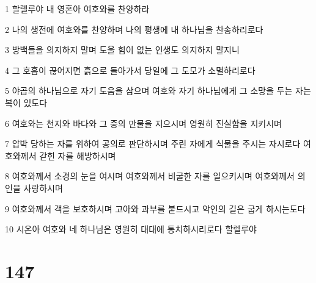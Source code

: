 \par 1 할렐루야 내 영혼아 여호와를 찬양하라
\par 2 나의 생전에 여호와를 찬양하며 나의 평생에 내 하나님을 찬송하리로다
\par 3 방백들을 의지하지 말며 도울 힘이 없는 인생도 의지하지 말지니
\par 4 그 호흡이 끊어지면 흙으로 돌아가서 당일에 그 도모가 소멸하리로다
\par 5 야곱의 하나님으로 자기 도움을 삼으며 여호와 자기 하나님에게 그 소망을 두는 자는 복이 있도다
\par 6 여호와는 천지와 바다와 그 중의 만물을 지으시며 영원히 진실함을 지키시며
\par 7 압박 당하는 자를 위하여 공의로 판단하시며 주린 자에게 식물을 주시는 자시로다 여호와께서 갇힌 자를 해방하시며
\par 8 여호와께서 소경의 눈을 여시며 여호와께서 비굴한 자를 일으키시며 여호와께서 의인을 사랑하시며
\par 9 여호와께서 객을 보호하시며 고아와 과부를 붙드시고 악인의 길은 굽게 하시는도다
\par 10 시온아 여호와 네 하나님은 영원히 대대에 통치하시리로다 할렐루야

\chapter{147}

